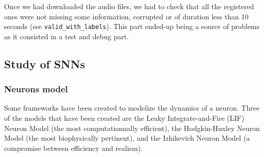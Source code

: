 \documentclass[11pt]{article}
\begin{document}
Once we had downloaded the audio files, we had to check that all the registered ones were not missing some information, corrupted or of duration less than 10 seconds (see \texttt{valid\_with\_labels}). This part ended-up being a source of problems as it consisted in a test and debug part.

\subsection{Study of SNNs}

\subsubsection{Neurons model}

Some frameworks have been created to modelize the dynamics of a neuron. Three of the models that have been created are the Leaky Integrate-and-Fire (LIF) Neuron Model (the most computationnally efficient), the Hodgkin-Huxley Neuron Model (the most biophysically pertinent), and the Izhikevich Neuron Model (a compromise between efficiency and realism).

\pagebreak
\end{document}
